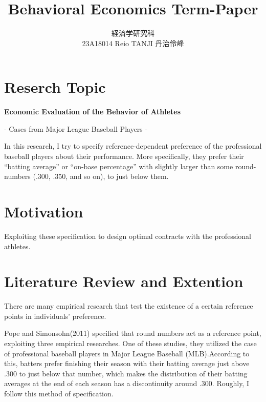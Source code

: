 \documentclass{jsarticle}[12pt]
\begin{document}
\title{Behavioral Economics Term-Paper}
\author{経済学研究科　 \\ 23A18014 Reio TANJI 丹治伶峰}
\date{}
\maketitle

\section{Reserch Topic}

\Large

\textbf{Economic Evaluation of the Behavior of Athletes}

\hspace{5zw}- Cases from Major League Baseball Players -

\large

\vspace{1zw}

\hspace{1zw}In this research, I try to specify reference-dependent preference of the professional baseball players about their performance. More specifically, they prefer their ``batting average'' or ``on-base percentage'' with slightly larger than some round-numbers (.300, .350, and so on), to just below them.

\section{Motivation}

Exploiting these specification to design optimal contracts with the professional athletes.

\section{Literature Review and Extention}

\hspace{1zw} There are many empirical research that test the existence of a certain reference points in individuals' preference.

\hspace{1zw} Pope and Simonsohn(2011) specified that round numbers act as a reference point, exploiting three empirical researches. One of these studies, they utilized the case of professional baseball players in Major League Baseball (MLB).According to this, batters prefer finishing their season with their batting average just above .300 to just below that number, which makes the distribution of their batting averages at the end of each season has a discontinuity around .300. Roughly, I follow this method of specification.
\end{document}
